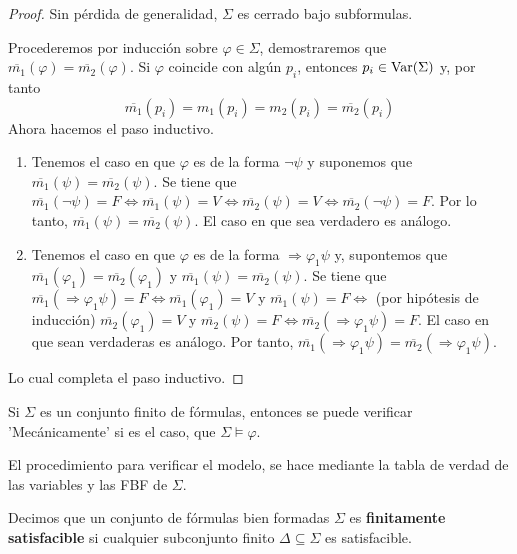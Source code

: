 \documentclass[12pt]{report}
\newcounter{it}
\theoremstyle{largebreak}
\begin{document}
    \begin{proof}
        Sin pérdida de generalidad, $\Sigma$ es cerrado bajo subformulas.
        
        Procederemos por inducción sobre $\varphi\in\Sigma$, demostraremos que $\overline{m_1}(\varphi)=\overline{m_2}(\varphi)$.
        Si $\varphi$ coincide con algún $p_i$, entonces $p_i\in\textup{Var}(\Sigma)$ y, por tanto
        \begin{equation*}
            \overline{m_1}(p_i)=m_1(p_i)=m_2(p_i)=\overline{m_2}(p_i)
        \end{equation*}
        Ahora hacemos el paso inductivo. 
        \begin{enumerate}
            \item Tenemos el caso en que $\varphi$ es de la forma $\neg\psi$ y suponemos que $\overline{m_1}(\psi)=\overline{m_2}(\psi)$. Se tiene que $\overline{m_1}(\neg \psi)=F\iff \overline{m_1}(\psi) = V \iff\overline{m_2}(\psi)=V\iff\overline{m_2}(\neg \psi)=F$. Por lo tanto, $\overline{m_1}(\psi)=\overline{m_2}(\psi)$. El caso en que sea verdadero es análogo.
            
            \item Tenemos el caso en que $\varphi$ es de la forma $\Rightarrow\varphi_1\psi$ y, supontemos que $\overline{m_1}(\varphi_1)=\overline{m_2}(\varphi_1)$ y $\overline{m_1}(\psi)=\overline{m_2}(\psi)$. Se tiene que $\overline{m_1}(\Rightarrow\varphi_1\psi)=F\iff\overline{m_1}(\varphi_1)=V$ y $\overline{m_1}(\psi)=F\iff$ (por hipótesis de inducción) $\overline{m_2}(\varphi_1)=V$ y $\overline{m_2}(\psi)=F\iff\overline{m_2}(\Rightarrow\varphi_1\psi)=F$. El caso en que sean verdaderas es análogo. Por tanto, $\overline{m_1}(\Rightarrow\varphi_1\psi)=\overline{m_2}(\Rightarrow\varphi_1\psi)$.
        \end{enumerate}
        Lo cual completa el paso inductivo.
    \end{proof}

    \begin{cor}
        Si $\Sigma$ es un conjunto finito de fórmulas, entonces se puede verificar 'Mecánicamente' si es el caso, que $\Sigma\vDash\varphi$.
    \end{cor}

    El procedimiento para verificar el modelo, se hace mediante la tabla de verdad de las variables y las FBF de $\Sigma$.

    \begin{mydef}
        Decimos que un conjunto de fórmulas bien formadas $\Sigma$ es \textbf{finitamente satisfacible} si cualquier subconjunto finito $\Delta\subseteq\Sigma$ es satisfacible.
    \end{mydef}
\end{document}
